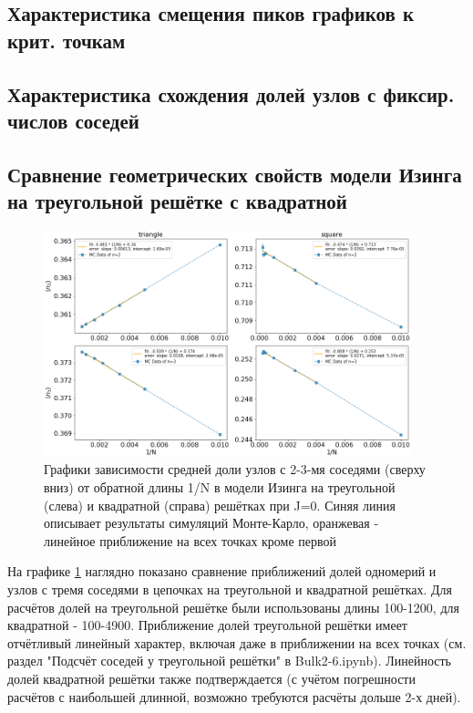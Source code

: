 \newpage

\subsection{Характеристика смещения пиков графиков к крит. точкам}

\subsection{Характеристика схождения долей узлов с фиксир. числов соседей}

\subsection{Сравнение геометрических свойств модели Изинга на треугольной решётке с квадратной}

\begin{figure}
    \centering
    \includegraphics[width=0.95\textwidth]{Sections/Images/triagle_vs_square_bulk.png}
    \caption{Графики зависимости средней доли узлов с 2-3-мя соседями (сверху вниз) от обратной длины 1/N в модели Изинга на треугольной (слева) и квадратной (справа) решётках при J=0. Синяя линия описывает результаты симуляций Монте-Карло, оранжевая - линейное приближение на всех точках кроме первой}
    \label{fig:tr_vs_sq_bulk}
\end{figure}

На графике \ref{fig:tr_vs_sq_bulk} наглядно показано сравнение приближений долей одномерий и узлов с тремя соседями в цепочках на треугольной и квадратной решётках. Для расчётов долей на треугольной решётке были использованы длины 100-1200, для квадратной - 100-4900. Приближение долей треугольной решётки имеет отчётливый линейный характер, включая даже в приближении на всех точках (см. раздел "Подсчёт соседей у треугольной решётки" в Bulk2-6.ipynb\cite{Git}). Линейность долей квадратной решётки также подтверждается (с учётом погрешности расчётов с наибольшей длинной, возможно требуются расчёты дольше 2-х дней).

